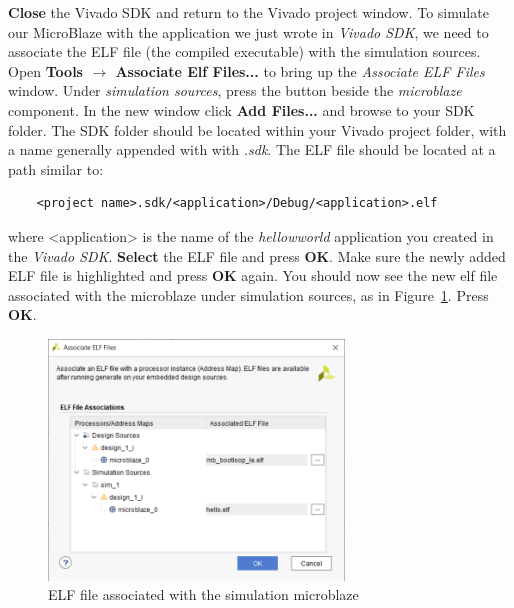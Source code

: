 \documentclass[11pt]{article}
\begin{document}
\textbf{Close} the Vivado SDK and return to the Vivado project window. To simulate our MicroBlaze with the application we just wrote in \textit{Vivado SDK}, we need to associate the ELF file (the compiled executable) with the simulation sources. Open \textbf{Tools $\rightarrow$ Associate Elf Files...} to bring up the \textit{Associate ELF Files} window. Under \textit{simulation sources}, press the
button beside the \textit{microblaze} component. In the new window click \textbf{Add Files...} and browse to your SDK folder. The SDK folder should be located within your Vivado project folder, with a name generally appended with with \textit{.sdk}. The ELF file should be located at a path similar to:

\begin{verbatim}
    <project name>.sdk/<application>/Debug/<application>.elf
\end{verbatim}

\noindent
where <application> is the name of the \textit{hellowworld} application you created in the \textit{Vivado SDK}. \textbf{Select} the ELF file and press \textbf{OK}. Make sure the newly added ELF file is highlighted and press \textbf{OK} again. You should now see the new elf file associated with the microblaze under simulation sources, as in Figure~\ref{fig:assoc_elf}. Press \textbf{OK}.

\begin{figure}[!h]
    \centering
    \includegraphics[width=0.7\textwidth]{images/assoc_elf.png}
    \caption{ELF file associated with the simulation microblaze}
    \label{fig:assoc_elf}
\end{figure}
\end{document}
